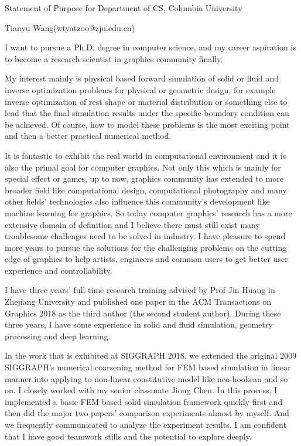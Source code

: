 \documentclass[a4paper,12pt]{article}
\begin{document}
\centerline{\large{Statement of Purpose for Department of CS, Columbia University}}
\vspace{2ex}
\centerline{\large{Tianyu Wang(wtyatzoo@zju.edu.cn)}}
\vspace{2ex}

I want to pursue a Ph.D. degree in computer science, and my career aspiration is to become a research scientist in graphics community finally.\vspace{1.2ex}

My interest mainly is physical based forward simulation of solid or fluid and inverse optimization problems for physical or geometric design, for example inverse optimization of rest shape or material distribution or something else to lead that the final simulation results under the specific boundary condition can be achieved. Of course, how to model these problems is the most exciting point and then a better practical numerical method.\vspace{1.2ex}

It is fantastic to exhibit the real world in computational environment and it is also the primal goal for computer graphics. Not only this which is mainly for special effect or games, up to now, graphics community has extended to more broader field like computational design, computational photography and many other fields' technologies also influence this community's development like machine learning for graphics. So today computer graphics' research has a more extensive domain of definition and I believe there must still exist many troublesome challenges need to be solved in industry. I have pleasure to spend more years to pursue the solutions for the challenging problems on the cutting edge of graphics to help artists, engineers and common users to get better user experience and controllability. \vspace{1.2ex} 

I have three years' full-time research training advised by Prof Jin Huang in Zhejiang University and published one paper in the ACM Transactions on Graphics 2018 as the third author (the second student author). During these three years, I have some experience in solid and fluid simulation, geometry processing and deep learning.\vspace{1.2ex} 

In the work that is exhibited at SIGGRAPH 2018, we extended the original 2009 SIGGRAPH's numerical coarsening method for FEM based simulation in linear manner into applying to non-linear constitutive model like neo-hookean and so on. I closely worked with my senior classmate Jiong Chen. In this process, I implemented a basic FEM based solid simulation framework quickly first and then did the major two papers' comparison experiments almost by myself. And we frequently communicated to analyze the experiment results. I am confident that I have good teamwork stills and the potential to explore deeply.\vspace{1.2ex}
\end{document}
